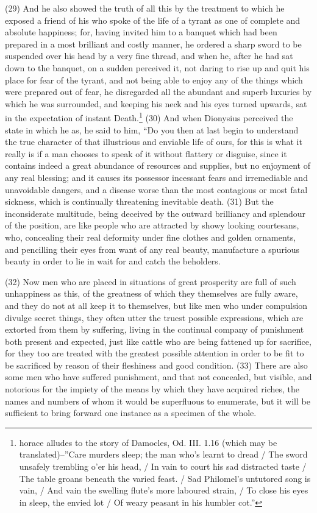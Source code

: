 (29) And he also showed the truth of all this by the treatment to which he exposed a friend of his
who spoke of the life of a tyrant as one of complete and absolute happiness; for, having invited him
to a banquet which had been prepared in a most brilliant and costly manner, he ordered a sharp
sword to be suspended over his head by a very fine thread, and when he, after he had sat down to
the banquet, on a sudden perceived it, not daring to rise up and quit his place for fear of the tyrant,
and not being able to enjoy any of the things which were prepared out of fear, he disregarded all
the abundant and superb luxuries by which he was surrounded, and keeping his neck and his eyes
turned upwards, sat in the expectation of instant Death.\footnote{horace alludes to the story of Damocles, Od. III.
1.16 (which may be translated)--''Care murders sleep; the man who's learnt to dread / The sword unsafely trembling o'er
his head, / In vain to court his sad distracted taste / The table groans beneath the varied feast. / Sad Philomel's untutored
song is vain, / And vain the swelling flute's more laboured strain, / To close his eyes in sleep, the envied lot / Of weary
peasant in his humbler cot.''} (30) And when Dionysius perceived the state in which he as, he said to
him, ``Do you then at last begin to understand the true character of that illustrious and enviable life
of ours, for this is what it really is if a man chooses to speak of it without flattery or disguise, since
it contains indeed a great abundance of resources and supplies, but no enjoyment of any real
blessing; and it causes its possessor incessant fears and irremediable and unavoidable dangers,
and a disease worse than the most contagious or most fatal sickness, which is continually
threatening inevitable death. (31) But the inconsiderate multitude, being deceived by the outward
brilliancy and splendour of the position, are like people who are attracted by showy looking
courtesans, who, concealing their real deformity under fine clothes and golden ornaments, and
pencilling their eyes from want of any real beauty, manufacture a spurious beauty in order to lie in
wait for and catch the beholders.

(32) Now men who are placed in situations of great prosperity are full of such unhappiness as this,
of the greatness of which they themselves are fully aware, and they do not at all keep it to
themselves, but like men who under compulsion divulge secret things, they often utter the truest
possible expressions, which are extorted from them by suffering, living in the continual company of
punishment both present and expected, just like cattle who are being fattened up for sacrifice, for
they too are treated with the greatest possible attention in order to be fit to be sacrificed by reason
of their fleshiness and good condition. (33) There are also some men who have suffered
punishment, and that not concealed, but visible, and notorious for the impiety of the means by
which they have acquired riches, the names and numbers of whom it would be superfluous to
enumerate, but it will be sufficient to bring forward one instance as a specimen of the whole.

